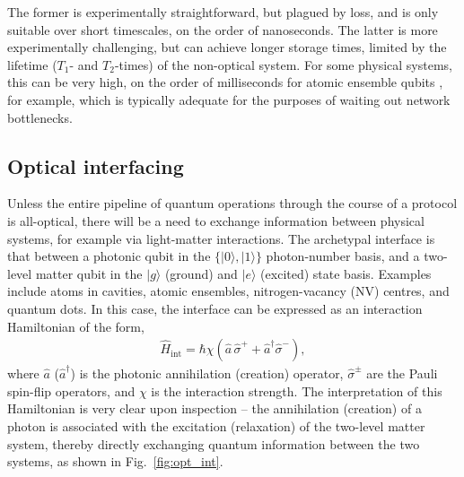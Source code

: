 \documentclass[aps,rmp,twocolumn,amsmath,amssymb,nofootinbib,superscriptaddress,longbibliography,floatfix]{revtex4-1}
\newcommand{\ket}[1]{|#1\rangle}
\begin{document}
The former is experimentally straightforward, but plagued by loss, and is only suitable over short timescales, on the order of nanoseconds. The latter is more experimentally challenging, but can achieve longer storage times, limited by the lifetime ($T_1$- and $T_2$-times) of the non-optical system. For some physical systems, this can be very high, on the order of milliseconds for atomic ensemble qubits \cite{???}, for example, which is typically adequate for the purposes of waiting out network bottlenecks.

%
%

\subsection{Optical interfacing} \label{sec:opt_inter}

Unless the entire pipeline of quantum operations through the course of a protocol is all-optical, there will be a need to exchange information between physical systems, for example via light-matter interactions. The archetypal interface is that between a photonic qubit in the \mbox{$\{\ket{0},\ket{1}\}$} photon-number basis, and a two-level matter qubit in the $\ket{g}$ (ground) and $\ket{e}$ (excited) state basis. Examples include atoms in cavities, atomic ensembles, nitrogen-vacancy (NV) centres, and quantum dots. In this case, the interface can be expressed as an interaction Hamiltonian of the form,
\begin{align} \label{eq:two_level_hamil}
\hat{H}_\mathrm{int} = \hbar \chi (\hat{a}\,\hat\sigma^+ + \hat{a}^\dag\hat\sigma^-),
\end{align}
where $\hat{a}$ ($\hat{a}^\dag$) is the photonic annihilation (creation) operator, $\hat\sigma^\pm$ are the Pauli spin-flip operators, and $\chi$ is the interaction strength. The interpretation of this Hamiltonian is very clear upon inspection -- the annihilation (creation) of a photon is associated with the excitation (relaxation) of the two-level matter system, thereby directly exchanging quantum information between the two systems, as shown in Fig.~\ref{fig:opt_int}.
\end{document}
